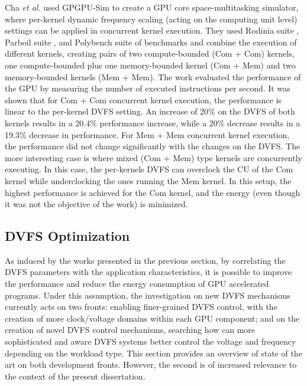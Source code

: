 Cha \textit{et al.} \cite{cha_core-level_2018} used GPGPU-Sim to create a GPU core space-multitasking simulator, where per-kernel dynamic frequency scaling (acting on the computing unit level) settings can be applied in concurrent kernel execution. They used Rodinia suite \cite{che_rodinia:_2009}, Parboil suite \cite{stratton_parboil:_nodate}, and Polybench suite \cite{noauthor_polybench/c_nodate} of benchmarks and combine the execution of different kernels, creating pairs of two compute-bounded (Com + Com) kernels, one compute-bounded plus one memory-bounded kernel (Com + Mem) and two memory-bounded kernels (Mem + Mem). The work evaluated the performance of the GPU by measuring the number of executed instructions per second. It was shown that for Com + Com concurrent kernel execution, the performance is linear to the per-kernel DVFS setting. An increase of 20\% on the DVFS of both kernels results in a 20.4\% performance increase, while a 20\% decrease results in a 19.3\% decrease in performance. For Mem + Mem concurrent kernel execution, the performance did not change significantly with the changes on the DVFS. The more interesting case is where mixed (Com + Mem) type kernels are concurrently executing. In this case, the per-kernels DVFS can overclock the CU of the Com kernel while underclocking the ones running the Mem kernel. In this setup, the highest performance is achieved for the Com kernel, and the energy (even though it was not the objective of the work) is minimized.

\subsection{DVFS Optimization}
\label{section:DVFS_opt}

As induced by the works presented in the previous section, by correlating the DVFS parameters with the application characteristics, it is possible to improve the performance and reduce the energy consumption of GPU accelerated programs. Under this assumption, the investigation on new DVFS mechanisms currently acts on two fronts: enabling finer-grained DVFS control, with the creation of more clock/voltage domains within each GPU component; and on the creation of novel DVFS control mechanisms, searching how can more sophisticated and aware DVFS systems better control the voltage and frequency depending on the workload type. This section provides an overview of state of the art on both development fronts. However, the second is of increased relevance to the context of the present dissertation.

